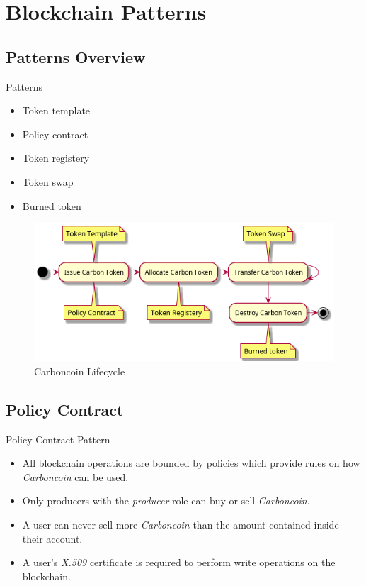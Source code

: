 \section{Blockchain Patterns}
\subsection{Patterns Overview}
\begin{frame}{Patterns}
    \begin{itemize}
        \item Token template
        \item Policy contract
        \item Token registery
        \item Token swap
        \item Burned token
    \end{itemize}
    \begin{figure}
        \caption{Carboncoin Lifecycle}
        \centering
        \includegraphics[height=0.5\textheight, width=0.6\linewidth,
            keepaspectratio]{photos/Token.png}
    \end{figure}
\end{frame}
\subsection{Policy Contract}
\begin{frame}{Policy Contract Pattern}
    \begin{itemize}
        \item All blockchain operations are bounded by policies which
              provide rules on how \textit{Carboncoin} can be used.
        \item Only producers with the \textit{producer} role can buy or
              sell \textit{Carboncoin}.
        \item A user can never sell more \textit{Carboncoin} than the amount
              contained inside their account.
        \item A user's \textit{X.509} certificate is required to perform write
              operations on the blockchain.
    \end{itemize}
\end{frame}

